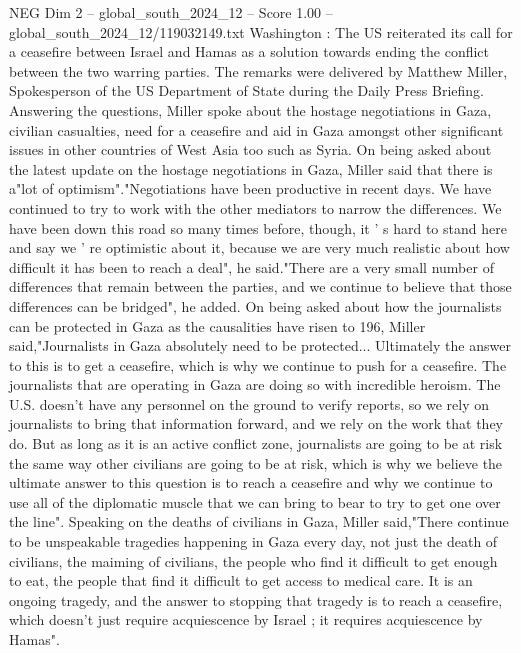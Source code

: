 \begin{textsample}{NEG Dim 2 – global\_south\_2024\_12 – Score 1.00 – global\_south\_2024\_12/119032149.txt}  \label{ex:f2_neg_239}
Washington : The US reiterated its call for a ceasefire between Israel and Hamas as a solution towards ending the conflict between the two warring parties.
The remarks were delivered by Matthew Miller, Spokesperson of the US Department of State during the Daily Press Briefing.
Answering the questions, Miller spoke about the hostage negotiations in Gaza, civilian casualties, need for a ceasefire and aid in Gaza amongst other significant issues in other countries of West Asia too such as Syria.
On being asked about the latest update on the hostage negotiations in Gaza, Miller said that there is a"lot of optimism"."Negotiations have been productive in recent days.
We have continued to try to work with the other mediators to narrow the differences.
We have been down this road so many times before, though, it ' s hard to stand here and say we ' re optimistic about it, because we are very much realistic about how difficult it has been to reach a deal", he said."There are a very small number of differences that remain between the parties, and we continue to believe that those differences can be bridged", he added.
On being asked about how the journalists can be protected in Gaza as the causalities have risen to 196, Miller said,"Journalists in Gaza absolutely need to be protected...
Ultimately the answer to this is to get a ceasefire, which is why we continue to push for a ceasefire.
The journalists that are operating in Gaza are doing so with incredible heroism.
The U.S. doesn't have any personnel on the ground to verify reports, so we rely on journalists to bring that information forward, and we rely on the work that they do.
But as long as it is an active conflict zone, journalists are going to be at risk the same way other civilians are going to be at risk, which is why we believe the ultimate answer to this question is to reach a ceasefire and why we continue to use all of the diplomatic muscle that we can bring to bear to try to get one over the line".
Speaking on the deaths of civilians in Gaza, Miller said,"There continue to be unspeakable tragedies happening in Gaza every day, not just the death of civilians, the maiming of civilians, the people who find it difficult to get enough to eat, the people that find it difficult to get access to medical care.
It is an ongoing tragedy, and the answer to stopping that tragedy is to reach a ceasefire, which doesn't just require acquiescence by Israel ; it requires acquiescence by Hamas".

\end{textsample}
